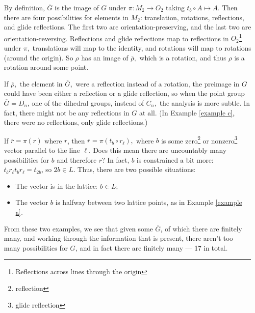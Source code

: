 \begin{ans}
By definition, $\overline{G}$ is the image of $G$ under $\pi: M_2 \rightarrow O_2$ taking $t_b \circ A \mapsto A.$ Then there are four possibilities for elements in $M_2$: translation, rotations, reflections, and glide reflections. The first two are orientation-preserving, and the last two are orientation-reversing. Reflections and glide reflections map to reflections in $O_2$\footnote{Reflections across lines through the origin} under $\pi,$ translations will map to the identity, and rotations will map to rotations (around the origin). So $\rho$ has an image of $\overline{\rho},$ which is a rotation, and thus $\rho$ is a rotation around some point.
\end{ans}

If $\overline{\rho},$ the element in $\overline{G},$ were a reflection instead of a rotation, the preimage in $G$ could have been either a reflection or a glide reflection, so when the point group $\overline{G} = D_n$, one of the dihedral groups, instead of $C_n,$ the analysis is more subtle. In fact, there might not be any reflections in $G$ at all. (In Example \ref{example c}, there were no reflections, only glide reflections.) 


\begin{example}

If $\overline{r} = \pi(r)$ where $r$, then $\overline{r} = \pi(t_b \circ r_\ell),$ where $b$ is some zero\footnote{reflection} or nonzero\footnote{glide reflection} vector parallel to the line $\ell$. Does this mean there are uncountably many possibilities for $b$ and therefore $r?$ In fact, $b$ is constrained a bit more: $t_b r_\ell t_b r_\ell = t_{2b}$, so $2b \in L$. Thus, there are two possible situations: 
\begin{itemize}
    \item The vector is in the lattice: $b \in L$;
    \item The vector $b$ is halfway between two lattice points, as in Example \ref{example a}.
\end{itemize}
\end{example}

From these two examples, we see that given some $\overline{G}$, of which there are finitely many, and working through the information that is present, there aren't too many possibilities for $G$, and in fact there are finitely many --- 17 in total. 

\newpage